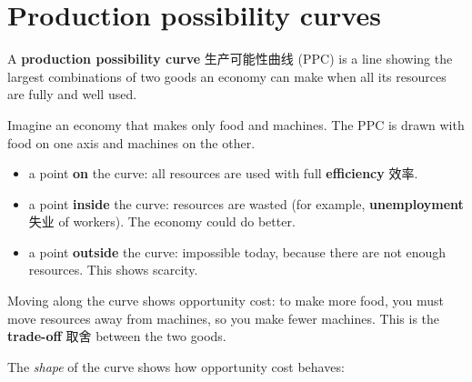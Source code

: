 \documentclass[11pt]{article}
\begin{document}
\begin{center}
\end{center}

\section*{Production possibility curves}

A \textbf{production possibility curve} 生产可能性曲线 (PPC) is a line showing the largest combinations of two goods an economy can make when all its resources are fully and well used.

Imagine an economy that makes only food and machines. The PPC is drawn with food on one axis and machines on the other.

\begin{itemize}
\item a point \textbf{on} the curve: all resources are used with full \textbf{efficiency} 效率.

\item a point \textbf{inside} the curve: resources are wasted (for example, \textbf{unemployment} 失业 of workers). The economy could do better.

\item a point \textbf{outside} the curve: impossible today, because there are not enough resources. This shows scarcity.

\end{itemize}

Moving along the curve shows opportunity cost: to make more food, you must move resources away from machines, so you make fewer machines. This is the \textbf{trade-off} 取舍 between the two goods.

The \emph{shape} of the curve shows how opportunity cost behaves:
\end{document}
